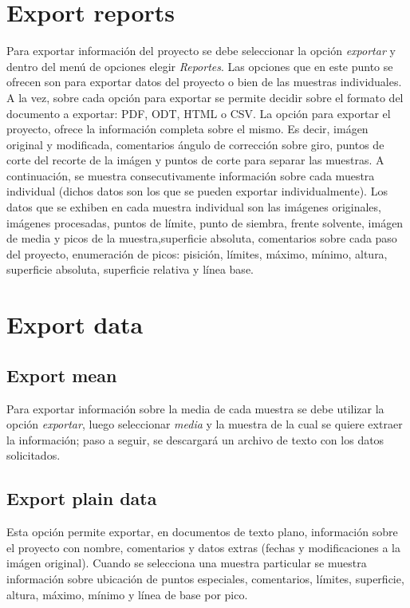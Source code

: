\section{Export reports}
Para exportar informaci\'on del proyecto se debe seleccionar la opci\'on \emph{exportar} y dentro del men\'u de opciones elegir \emph{Reportes}. Las opciones que en este punto se ofrecen son para exportar datos del proyecto o bien de las muestras individuales. A la vez, sobre cada opci\'on para exportar se permite decidir sobre el formato del documento a exportar: PDF, ODT, HTML o CSV. 
La opci\'on para exportar el proyecto, ofrece la informaci\'on completa sobre el mismo. Es decir, im\'agen original y modificada, comentarios \'angulo de correcci\'on sobre giro, puntos de corte del recorte de la im\'agen y puntos de corte para separar las muestras. A continuaci\'on, se muestra consecutivamente informaci\'on sobre cada muestra individual (dichos datos son los que se pueden exportar individualmente). Los datos que se exhiben en cada muestra individual son las im\'agenes originales, im\'agenes procesadas, puntos de l\'imite, punto de siembra, frente solvente, im\'agen de media y picos de la muestra,superficie absoluta, comentarios sobre cada paso del proyecto, enumeraci\'on de picos: pisici\'on, l\'imites, m\'aximo, m\'inimo, altura, superficie absoluta, superficie relativa y l\'inea base.

\section{Export data}
\subsection{Export mean}
Para exportar informaci\'on sobre la media de cada muestra se debe utilizar la opci\'on \emph{exportar}, luego seleccionar \emph{media} y la muestra de la cual se quiere extraer la informaci\'on; paso a seguir, se descargar\'a un archivo de texto con los datos solicitados.

\subsection{Export plain data}
Esta opci\'on permite exportar, en documentos de texto plano, informaci\'on sobre el proyecto con nombre, comentarios y datos extras (fechas y modificaciones a la im\'agen original). Cuando se selecciona una muestra particular se muestra informaci\'on sobre ubicaci\'on de puntos especiales, comentarios, l\'imites, superficie, altura, m\'aximo, m\'inimo y l\'inea de base por pico.